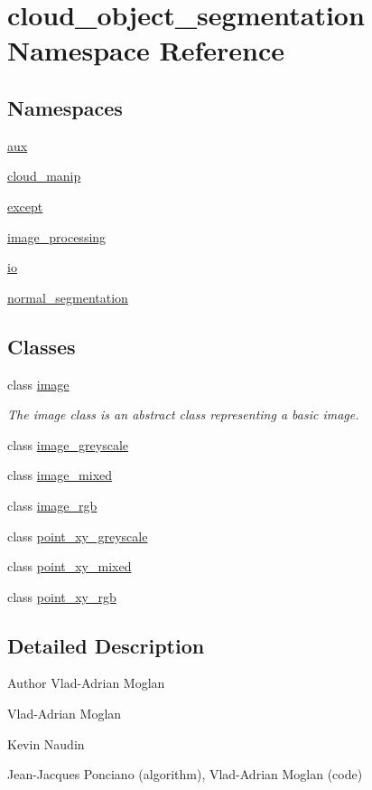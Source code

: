 \hypertarget{namespacecloud__object__segmentation}{}\section{cloud\+\_\+object\+\_\+segmentation Namespace Reference}
\label{namespacecloud__object__segmentation}
\subsection*{Namespaces}
\begin{DoxyCompactItemize}
\item 
 \hyperlink{namespacecloud__object__segmentation_1_1aux}{aux}
\item 
 \hyperlink{namespacecloud__object__segmentation_1_1cloud__manip}{cloud\+\_\+manip}
\item 
 \hyperlink{namespacecloud__object__segmentation_1_1except}{except}
\item 
 \hyperlink{namespacecloud__object__segmentation_1_1image__processing}{image\+\_\+processing}
\item 
 \hyperlink{namespacecloud__object__segmentation_1_1io}{io}
\item 
 \hyperlink{namespacecloud__object__segmentation_1_1normal__segmentation}{normal\+\_\+segmentation}
\end{DoxyCompactItemize}
\subsection*{Classes}
\begin{DoxyCompactItemize}
\item 
class \hyperlink{classcloud__object__segmentation_1_1image}{image}
\begin{DoxyCompactList}\small\item\em The image class is an abstract class representing a basic image. \end{DoxyCompactList}\item 
class \hyperlink{classcloud__object__segmentation_1_1image__greyscale}{image\+\_\+greyscale}
\item 
class \hyperlink{classcloud__object__segmentation_1_1image__mixed}{image\+\_\+mixed}
\item 
class \hyperlink{classcloud__object__segmentation_1_1image__rgb}{image\+\_\+rgb}
\item 
class \hyperlink{classcloud__object__segmentation_1_1point__xy__greyscale}{point\+\_\+xy\+\_\+greyscale}
\item 
class \hyperlink{classcloud__object__segmentation_1_1point__xy__mixed}{point\+\_\+xy\+\_\+mixed}
\item 
class \hyperlink{classcloud__object__segmentation_1_1point__xy__rgb}{point\+\_\+xy\+\_\+rgb}
\end{DoxyCompactItemize}


\subsection{Detailed Description}
\begin{DoxyAuthor}{Author}
Vlad-\/\+Adrian Moglan

Vlad-\/\+Adrian Moglan 

Kevin Naudin

Jean-\/\+Jacques Ponciano (algorithm), Vlad-\/\+Adrian Moglan (code) 
\end{DoxyAuthor}
